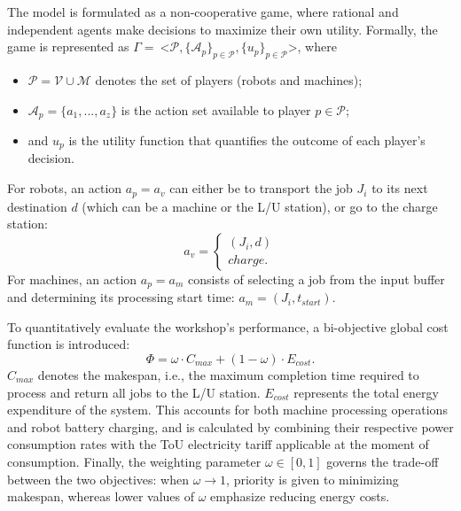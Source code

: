 \documentclass[preprint, 3p, review, 12pt]{elsarticle}
\begin{document}
The model is formulated as a non-cooperative game, where rational and independent agents make decisions to maximize their own utility. Formally, the game is represented as $\Gamma = \:$\textless $\mathcal{P}, \{\mathcal{A}_{p}\}_{p \in \mathcal{P}}, \{u_p\}_{p \in \mathcal{P}}$\textgreater\:, where
\begin{itemize}
    \item $\mathcal{P} = \mathcal{V} \cup \mathcal{M}$ denotes the set of players (robots and machines);
    \item \(\mathcal{A}_p = \{a_1, ..., a_{z}\}\) is the action set available to player $p \in \mathcal{P}$; 
    \item and $u_p$ is the utility function that quantifies the outcome of each player’s decision.
\end{itemize}
For robots, an action $a_{p} = a_{v}$ can either be to transport the job $J_i$ to its next destination $d$ (which can be a machine or the L/U station), or go to the charge station:
\begin{equation*}
    a_{v} = 
    \begin{cases}
        (J_i, d) \\
        charge.
    \end{cases}
\end{equation*}
For machines, an action $a_{p} = a_{m}$ consists of selecting a job from the input buffer and determining its processing start time: $a_m = (J_i, t_{start})$.

To quantitatively evaluate the workshop’s performance, a bi-objective global cost function is introduced:
\begin{equation}
    \Phi = \omega \cdot C_{max} + (1 - \omega)\cdot E_{cost}.
\end{equation}
$C_{max}$ denotes the makespan, i.e., the maximum completion time required to process and return all jobs to the L/U station. $E_{cost}$ represents the total energy expenditure of the system. This accounts for both machine processing operations and robot battery charging, and is calculated by combining their respective power consumption rates with the ToU electricity tariff applicable at the moment of consumption. Finally, the weighting parameter $\omega \in [0, 1]$ governs the trade-off between the two objectives: when $\omega \longrightarrow 1$, priority is given to minimizing makespan, whereas lower values of $\omega$ emphasize reducing energy costs.
\end{document}
